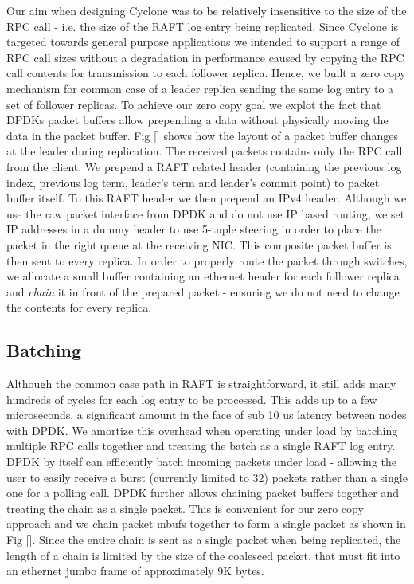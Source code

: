 \documentclass[twocolumn]{article}
\begin{document}
Our aim when designing Cyclone was to be relatively insensitive to the size of
the RPC call - i.e. the size of the RAFT log entry being replicated. Since
Cyclone is targeted towards general purpose applications we intended to support
a range of RPC call sizes without a degradation in performance caused by copying
the RPC call contents for transmission to each follower replica. Hence, we built
a zero copy mechanism for common case of a leader replica sending the same log
entry to a set of follower replicas. To achieve our zero copy goal we explot the
fact that DPDKs packet buffers allow prepending a data without physically moving
the data in the packet buffer. Fig [] shows how the layout of a packet buffer
changes at the leader during replication. The received packets contains only the
RPC call from the client. We prepend a RAFT related header (containing the
previous log index, previous log term, leader's term and leader's commit
point) to packet buffer itself. To this RAFT header we then prepend an IPv4
header. Although we use the raw packet interface from DPDK and do not use IP
based routing, we set IP addresses in a dummy header to use 5-tuple steering in
order to place the packet in the right queue at the receiving NIC. This
composite packet buffer is then sent to every replica. In order to properly
route the packet through switches, we allocate a small buffer containing an
ethernet header for each follower replica and \emph{chain} it in front of the
prepared packet - ensuring we do not need to change the contents for every
replica.

\subsection{Batching}
Although the common case path in RAFT is straightforward, it still adds many
hundreds of cycles for each log entry to be processed. This adds up to a few
microseconds, a significant amount in the face of sub 10 us latency between
nodes with DPDK. We amortize this overhead when operating under load by batching
multiple RPC calls together and treating the batch as a single RAFT log entry.
DPDK by itself can efficiently batch incoming packets under load - allowing the
user to easily receive a burst (currently limited to 32) packets rather than a
single one for a polling call. DPDK further allows chaining packet buffers
together and treating the chain as a single packet. This is convenient for our
zero copy approach and we chain packet mbufs together to form a single packet
as shown in Fig []. Since the entire chain is sent as a single packet when being
replicated, the length of a chain is limited by the size of the coalesced
packet, that must fit into an ethernet jumbo frame of approximately 9K bytes.
\end{document}
